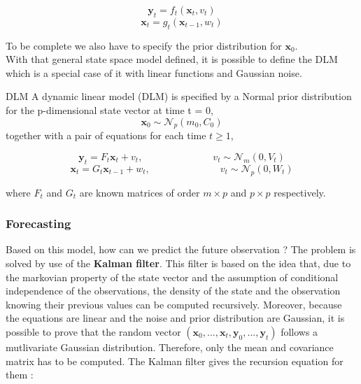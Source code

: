 \documentclass{article}
\begin{document}
$$\mathbf{y}_t = f_t(\mathbf{x}_t, v_t)$$
$$\mathbf{x}_t = g_t(\mathbf{x}_{t-1}, w_t)$$

To be complete we also have to specify the prior distribution for $\mathbf{x}_0$. \\

With that general state space model defined, it is possible to define the DLM which is a special case of it with linear functions and Gaussian noise. \\

\theoremstyle{definition}
\begin{definition}{DLM}
A dynamic linear model (DLM) is specified by a Normal prior distribution for the p-dimensional state vector at time t = 0,
$$\mathbf{x}_0 \sim \mathcal{N}_p(m_0, C_0)$$
together with a pair of equations for each time $t \ge 1$,

$$\mathbf{y}_t = F_t\mathbf{x}_t + v_t, \hspace{3cm} v_t \sim \mathcal{N}_m(0, V_t)$$
$$\mathbf{x}_t = G_t\mathbf{x}_{t-1} + w_t, \hspace{3cm} v_t \sim \mathcal{N}_p(0, W_t)$$

where $F_t$ and $G_t$ are known matrices of order $m \times p$ and $p \times p$ respectively.
\end{definition}

\subsubsection*{Forecasting}

Based on this model, how can we predict the future observation ? The problem is solved by use of the \textbf{Kalman filter}. This filter is based on the idea that, due to the markovian property of the state vector and the assumption of conditional independence of the observations, the density of the state and the observation knowing their previous values can be computed recursively. Moreover, because the equations are linear and the noise and prior distribution are Gaussian, it is possible to prove that the random vector $(\mathbf{x}_0, ..., \mathbf{x}_t, \mathbf{y}_0, ..., \mathbf{y}_t)$ follows a mutlivariate Gaussian distribution. Therefore, only the mean and covariance matrix has to be computed. The Kalman filter gives the recursion equation for them : \\
\end{document}
